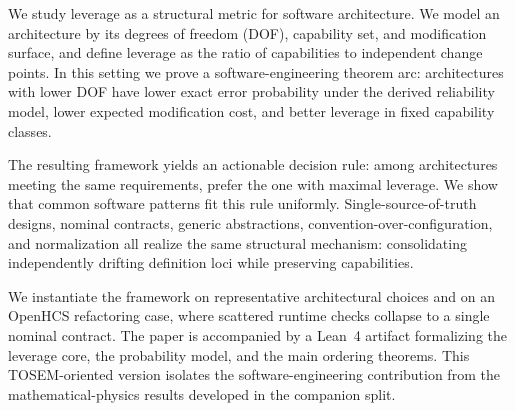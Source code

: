 We study leverage as a structural metric for software architecture. We model an architecture by its degrees of freedom (DOF), capability set, and modification surface, and define leverage as the ratio of capabilities to independent change points. In this setting we prove a software-engineering theorem arc: architectures with lower DOF have lower exact error probability under the derived reliability model, lower expected modification cost, and better leverage in fixed capability classes.

The resulting framework yields an actionable decision rule: among architectures meeting the same requirements, prefer the one with maximal leverage. We show that common software patterns fit this rule uniformly. Single-source-of-truth designs, nominal contracts, generic abstractions, convention-over-configuration, and normalization all realize the same structural mechanism: consolidating independently drifting definition loci while preserving capabilities.

We instantiate the framework on representative architectural choices and on an OpenHCS refactoring case, where scattered runtime checks collapse to a single nominal contract. The paper is accompanied by a Lean~4 artifact formalizing the leverage core, the probability model, and the main ordering theorems. This TOSEM-oriented version isolates the software-engineering contribution from the mathematical-physics results developed in the companion split.
